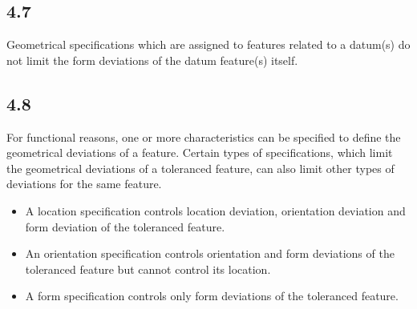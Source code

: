 \documentclass[a4paper,12pt]{article}
\begin{document}
\subsection*{4.7}
Geometrical specifications which are assigned to features related to a datum(s) do not limit the form deviations of the datum feature(s) itself.

\subsection*{4.8}
For functional reasons, one or more characteristics can be specified to define the geometrical deviations of a feature. Certain types of specifications, which limit the geometrical deviations of a toleranced feature, can also limit other types of deviations for the same feature.

\begin{itemize}[label=--]
    \item A location specification controls location deviation, orientation deviation and form deviation of the toleranced feature.
    \item An orientation specification controls orientation and form deviations of the toleranced feature but cannot control its location.
    \item A form specification controls only form deviations of the toleranced feature.
\end{itemize}
\end{document}
